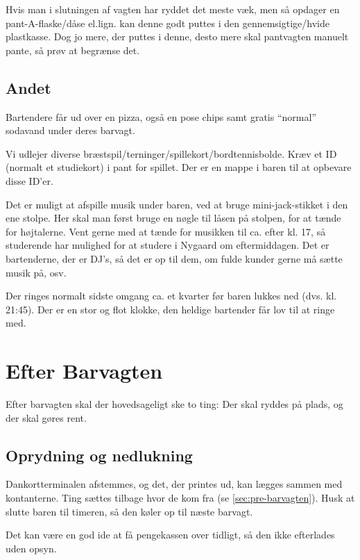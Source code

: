 Hvis man i slutningen af vagten har ryddet det meste væk, men så
opdager en pant-A-flaske/dåse el.lign. kan denne godt puttes i den
gennemsigtige/hvide plastkasse. Dog jo mere, der puttes i denne, desto
mere skal pantvagten manuelt pante, så prøv at begrænse det.

\subsection{Andet}
\label{sec:intra:andet}

Bartendere får ud over en pizza, også en pose chips samt gratis
``normal'' sodavand under deres barvagt.

Vi udlejer diverse
bræstspil/terninger/spillekort/bordtennisbolde. Kræv et ID (normalt et
studiekort) i pant for spillet. Der er en mappe i baren til at
opbevare disse ID'er.

Det er muligt at afspille musik under baren, ved at bruge
mini-jack-stikket i den ene stolpe. Her skal man først bruge en nøgle
til låsen på stolpen, for at tænde for højtalerne. Vent gerne med at
tænde for musikken til ca. efter kl. 17, så studerende har mulighed
for at studere i Nygaard om eftermiddagen. Det er bartenderne, der er
DJ's, så det er op til dem, om fulde kunder gerne må sætte musik på,
osv.

Der ringes normalt sidste omgang ca. et kvarter før baren lukkes ned
(dvs. kl. 21:45). Der er en stor og flot klokke, den heldige bartender
får lov til at ringe med.

\section{Efter Barvagten}
\label{sec:post-barvagten}

Efter barvagten skal der hovedsageligt ske to ting: Der skal ryddes på
plads, og der skal gøres rent.

\subsection{Oprydning og nedlukning}
\label{sec:post:oprydning}

Dankortterminalen afstemmes, og det, der printes ud, kan lægges sammen
med kontanterne. Ting sættes tilbage hvor de kom fra (se
\autoref{sec:pre-barvagten}). Husk at slutte baren til timeren, så den
køler op til næste barvagt.

Det kan være en god ide at få
pengekassen over tidligt, så den ikke efterlades uden opsyn.


